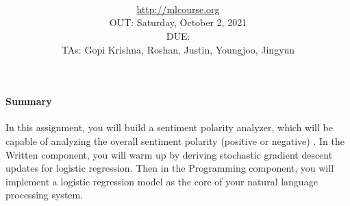 \documentclass[11pt,addpoints,answers]{exam}
\title{\textsc{\hwName}
} %
\author{\courseName\\
\url{http://mlcourse.org} \\
OUT: Saturday, October 2, 2021 \\
DUE: \dueDate{} \\ 
TAs: Gopi Krishna, Roshan, Justin, Youngjoo, Jingyun
}
\date{}
\date{}
\begin{document}
\maketitle



\begin{notebox}
\paragraph{Summary} In this assignment, you will build a sentiment polarity analyzer, which will be capable of analyzing the overall sentiment polarity (positive or negative) . In the Written component, you will warm up by deriving stochastic gradient descent updates for logistic regression. Then in the Programming component, you will implement a logistic regression model as the core of your natural language processing system.
\end{notebox}
\end{document}
